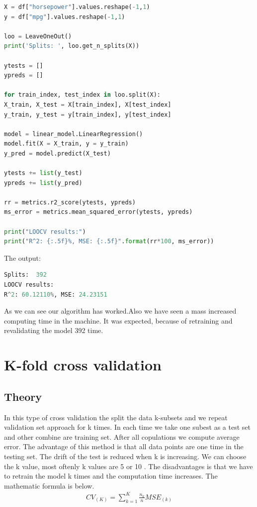 \begin{lstlisting}[language=Python]
X = df["horsepower"].values.reshape(-1,1)
y = df["mpg"].values.reshape(-1,1) 

loo = LeaveOneOut()
print('Splits: ', loo.get_n_splits(X))

ytests = []
ypreds = []

for train_index, test_index in loo.split(X):
X_train, X_test = X[train_index], X[test_index]
y_train, y_test = y[train_index], y[test_index]

model = linear_model.LinearRegression()
model.fit(X = X_train, y = y_train)
y_pred = model.predict(X_test)

ytests += list(y_test)
ypreds += list(y_pred)

rr = metrics.r2_score(ytests, ypreds)
ms_error = metrics.mean_squared_error(ytests, ypreds)

print("LOOCV results:")
print("R^2: {:.5f}%, MSE: {:.5f}".format(rr*100, ms_error))
\end{lstlisting}

The output:
\begin{lstlisting}[language=Python]
Splits:  392
LOOCV results:
R^2: 60.12110%, MSE: 24.23151
\end{lstlisting}

As we can see our algorithm has worked.Also we have seen a mass increased computing time in the machine. It was expected, because of retraining and revalidating the model 392 time.

\section {K-fold cross validation}%
\subsection{Theory}
In this type of cross validation the split the data k-subsets and we repeat validation set approach for k times. In each time we take one subest as a test set and other combine are training set. After all copulations we compute average error. The advantage of this method is that all data points are one time in the testing set. The drift of the test is reduced when k is increasing. We can choose the k value, most oftenly k values are 5 or 10 . The disadvantages is that we have to retrain the model k times and the computation time increases. The mathematic formula is below. 
\begin{align}\label{fo:k-fold}
CV_{(K)} = \sum_{k=1}^{K}  \frac {n_{k}}{n}MSE_{(k)}
\end{align}

